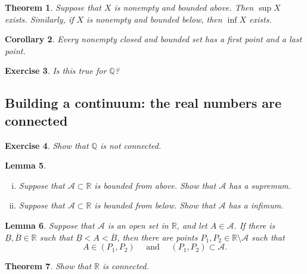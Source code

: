 \documentclass{amsart}
\newtheorem{theorem}{Theorem}
\newtheorem{lemma}[theorem]{Lemma}
\newtheorem{corollary}[theorem]{Corollary}
\newtheorem{exercise}[theorem]{Exercise}
\newcommand{\Q}{\mathbb Q}
\newcommand{\R}{\mathbb R}
\newcommand{\1}{\mathds{1}}
\newcommand{\cA}{\mathcal A}
\newcommand{\cB}{\mathcal B}
\def \R {{\mathbb {R}}}
\numberwithin{equation}{section}
\numberwithin{theorem}{section}
\begin{document}
\begin{theorem}  Suppose that $X$ is nonempty and bounded above. Then $\sup X$ exists. Similarly, if $X$ is nonempty and bounded below, then $\inf X$ exists.
\end{theorem}

\begin{corollary}  Every nonempty closed and bounded set has a first point and a last point.
\end{corollary}


\begin{exercise}  Is this true for $\mathbb{Q}$?
\end{exercise}




\subsection{Building a continuum: the real numbers are connected}

\begin{exercise}
	Show that $\Q$ is not connected.
\end{exercise}



%	
\begin{lemma}
	\begin{enumerate}[(i)]
		\item Suppose that $\cA \subset \R$ is bounded from above.  Show that $\cA$ has a supremum.
		\item Suppose that $\cA \subset \R$ is bounded from below.  Show that $\cA$ has a infimum.
	\end{enumerate}
\end{lemma}


\begin{lemma}
Suppose that $\cA$ is an open set in $\R$, and let $A \in \cA$.  If there is $\underline B, \overline B \in \R$ such that $\underline B < A < \overline B$, then there are points $P_1, P_2 \in \R\setminus \cA$ such that
\[
	A \in (P_1, P_2)
		\quad\text{ and }\quad
	(P_1, P_2) \subset \cA.
\]
\end{lemma}




\begin{theorem}
	Show that $\R$ is connected.
\end{theorem}
\end{document}
